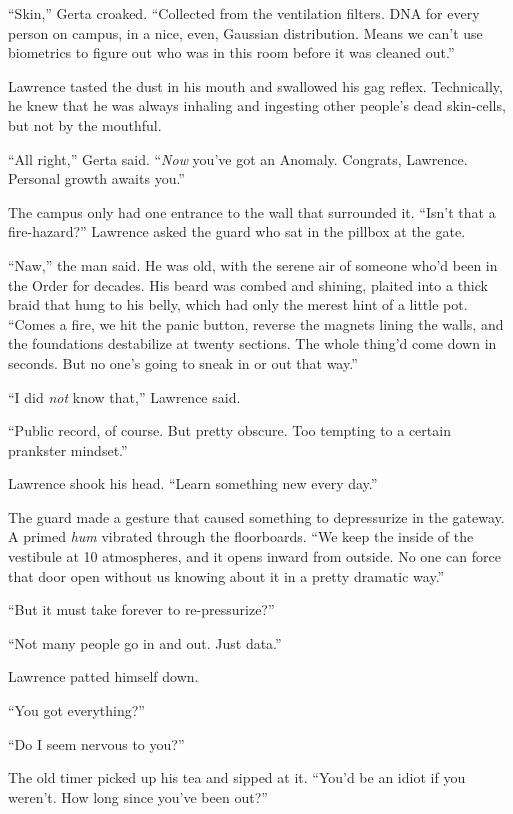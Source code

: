 “Skin,” Gerta croaked. “Collected from the ventilation filters. 
DNA for every person on campus, in a nice, even, Gaussian distribution. 
Means we can't use biometrics to figure out who was in this room before 
it was cleaned out.”

Lawrence tasted the dust in his mouth and swallowed his gag reflex. 
Technically, he knew that he was always inhaling and ingesting other 
people's dead skin-cells, but not by the mouthful.

“All right,” Gerta said. “\emph{Now} you've got an Anomaly. 
Congrats, Lawrence. Personal growth awaits you.”

\tb

The campus only had one entrance to the wall that surrounded it. 
“Isn't that a fire-hazard?” Lawrence asked the guard who sat in the 
pillbox at the gate.

“Naw,” the man said. He was old, with the serene air of someone 
who'd been in the Order for decades. His beard was combed and shining, 
plaited into a thick braid that hung to his belly, which had only the 
merest hint of a little pot. “Comes a fire, we hit the panic button, 
reverse the magnets lining the walls, and the foundations destabilize 
at twenty sections. The whole thing'd come down in seconds. But no 
one's going to sneak in or out that way.”

“I did \emph{not} know that,” Lawrence said.

“Public record, of course. But pretty obscure. Too tempting to a 
certain prankster mindset.”

Lawrence shook his head. “Learn something new every day.”

The guard made a gesture that caused something to depressurize in the 
gateway. A primed \emph{hum} vibrated through the floorboards. “We 
keep the inside of the vestibule at 10 atmospheres, and it opens inward 
from outside. No one can force that door open without us knowing about 
it in a pretty dramatic way.”

“But it must take forever to re-pressurize?”

“Not many people go in and out. Just data.”

Lawrence patted himself down.

“You got everything?”

“Do I seem nervous to you?”

The old timer picked up his tea and sipped at it. “You'd be an idiot 
if you weren't. How long since you've been out?”

